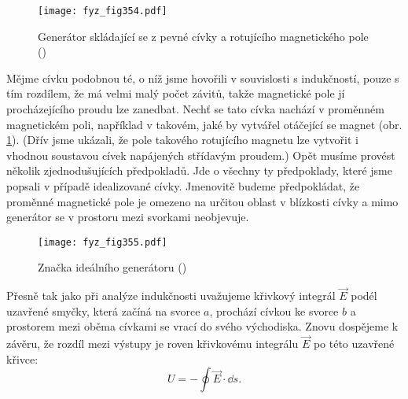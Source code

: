   \begin{figure}[ht!] %
    \centering
    \texttt{[image: fyz\_fig354.pdf]}
    \caption{Generátor skládající se z pevné cívky a rotujícího magnetického pole
             (\cite[s.~395]{Feynman02})}
    \label{fyz:fig354}
  \end{figure}
  
  Mějme cívku podobnou té, o níž jsme hovořili v souvislosti s indukčností, pouze s tím rozdílem, 
  že má velmi malý počet závitů, takže magnetické pole jí procházejícího proudu lze zanedbat. Nechť 
  se tato cívka nachází v proměnném magnetickém poli, například v takovém, jaké by vytvářel 
  otáčející se magnet (obr. \ref{fyz:fig354}). (Dřív jsme ukázali, že pole takového rotujícího 
  magnetu lze vytvořit i vhodnou soustavou cívek napájených střídavým proudem.) Opět musíme provést 
  několik zjednodušujících předpokladů. Jde o všechny ty předpoklady, které jsme popsali v případě 
  idealizované cívky. Jmenovitě budeme předpokládat, že proměnné magnetické pole je omezeno na 
  určitou oblast v blízkosti cívky a mimo generátor se v prostoru mezi svorkami neobjevuje.

  \begin{figure}[ht!] %
    \centering
    \texttt{[image: fyz\_fig355.pdf]}
    \caption{Značka ideálního generátoru
             (\cite[s.~396]{Feynman02})}
    \label{fyz:fig355}
  \end{figure}
  
  Přesně tak jako při analýze indukčnosti uvažujeme křivkový integrál \(\vec{E}\) podél uzavřené 
  smyčky, která začíná na svorce \(a\), prochází cívkou ke svorce \(b\) a prostorem mezi oběma 
  cívkami se vrací do svého východiska. Znovu dospějeme k závěru, že rozdíl mezi výstupy je roven 
  křivkovému integrálu \(\vec{E}\) po této uzavřené křivce:
  \begin{equation}\label{fyz:eq478}
   U = -\oint\vec{E}\cdot\dd{s}.
  \end{equation}

